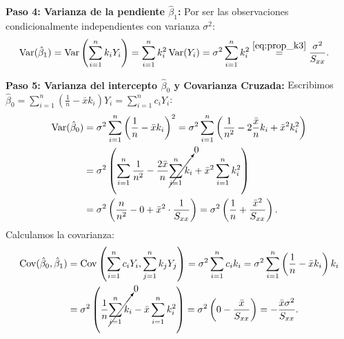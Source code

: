 \documentclass[11pt,a4paper]{article}
\begin{document}
\begin{demobox}
\textbf{Paso 4: Varianza de la pendiente $\hat{\beta}_1$:}  
Por ser las observaciones condicionalmente independientes con varianza $\sigma^2$:
\begin{align}
\operatorname{Var}(\hat{\beta}_1) &= \operatorname{Var}\left(\sum_{i=1}^n k_i Y_i\right) = \sum_{i=1}^n k_i^2 \operatorname{Var}(Y_i) = \sigma^2 \sum_{i=1}^n k_i^2 \overset{\eqref{eq:prop_k3}}{=} \frac{\sigma^2}{S_{xx}}.
\end{align}

\textbf{Paso 5: Varianza del intercepto $\hat{\beta}_0$ y Covarianza Cruzada:}  
Escribimos $\hat{\beta}_0 = \sum_{i=1}^n \left(\frac{1}{n} - \bar{x}k_i\right)Y_i = \sum_{i=1}^n c_i Y_i$:
\begin{align}
\operatorname{Var}(\hat{\beta}_0) &= \sigma^2 \sum_{i=1}^n \left(\frac{1}{n} - \bar{x}k_i\right)^2 = \sigma^2 \sum_{i=1}^n \left( \frac{1}{n^2} - 2\frac{\bar{x}}{n}k_i + \bar{x}^2 k_i^2 \right) \\
&= \sigma^2 \left( \sum_{i=1}^n \frac{1}{n^2} - \frac{2\bar{x}}{n}\cancelto{0}{\sum_{i=1}^n k_i} + \bar{x}^2 \sum_{i=1}^n k_i^2 \right) \\
&= \sigma^2 \left( \frac{n}{n^2} - 0 + \bar{x}^2 \cdot \frac{1}{S_{xx}} \right) = \sigma^2 \left(\frac{1}{n} + \frac{\bar{x}^2}{S_{xx}}\right).
\end{align}
Calculamos la covarianza:
\begin{align}
\operatorname{Cov}(\hat{\beta}_0, \hat{\beta}_1) &= \operatorname{Cov}\left( \sum_{i=1}^n c_i Y_i, \sum_{j=1}^n k_j Y_j \right) = \sigma^2 \sum_{i=1}^n c_i k_i = \sigma^2 \sum_{i=1}^n \left(\frac{1}{n} - \bar{x}k_i\right)k_i \\
&= \sigma^2 \left( \frac{1}{n}\cancelto{0}{\sum_{i=1}^n k_i} - \bar{x}\sum_{i=1}^n k_i^2 \right) = \sigma^2 \left( 0 - \frac{\bar{x}}{S_{xx}} \right) = -\frac{\bar{x}\sigma^2}{S_{xx}}.
\end{align}


\end{demobox}
\end{document}
